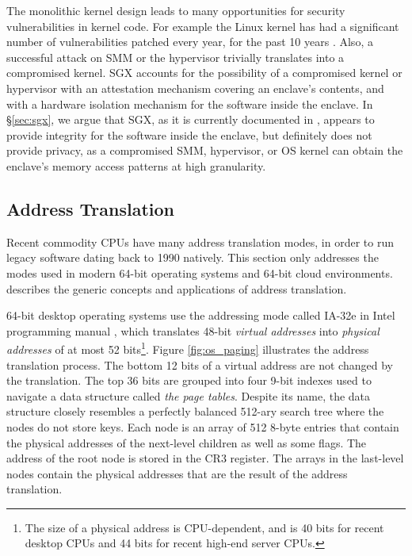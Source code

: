 The monolithic kernel design leads to many opportunities for security
vulnerabilities in kernel code. For example the Linux kernel has had a
significant number of vulnerabilities patched every year, for the past 10 years
\cite{cvedetails2014linux} \cite{chen2011linux}. Also, a successful attack on
SMM or the hypervisor trivially translates into a compromised kernel. SGX
accounts for the possibility of a compromised kernel or hypervisor with an
attestation mechanism covering an enclave's contents, and with a hardware
isolation mechanism for the software inside the enclave. In \S \ref{sec:sgx},
we argue that SGX, as it is currently documented in \cite{intel2013sgxmanual},
appears to provide integrity for the software inside the enclave, but
definitely does not provide privacy, as a compromised SMM, hypervisor, or OS
kernel can obtain the enclave's memory access patterns at high granularity.


\subsection{Address Translation}
\label{sec:paging}

Recent commodity CPUs have many address translation modes, in order to run
legacy software dating back to 1990 natively. This section only addresses the
modes used in modern 64-bit operating systems and 64-bit cloud environments.
\cite{jacob1998virtual} describes the generic concepts and applications of
address translation.

64-bit desktop operating systems use the addressing mode called IA-32e in
Intel programming manual \cite{intel2013manual}, which translates 48-bit
\textit{virtual addresses} into \textit{physical addresses} of at most 52
bits\footnote{The size of a physical address is CPU-dependent, and is 40 bits
for recent desktop CPUs and 44 bits for recent high-end server CPUs.}. Figure
\ref{fig:os_paging} illustrates the address translation process. The bottom 12
bits of a virtual address are not changed by the translation. The top 36 bits
are grouped into four 9-bit indexes used to navigate a data structure called
\textit{the page tables}. Despite its name, the data structure closely
resembles a perfectly balanced 512-ary search tree where the nodes do not store
keys. Each node is an array of 512 8-byte entries that contain the physical
addresses of the next-level children as well as some flags. The address of the
root node is stored in the CR3 register. The arrays in the last-level nodes
contain the physical addresses that are the result of the address translation.

